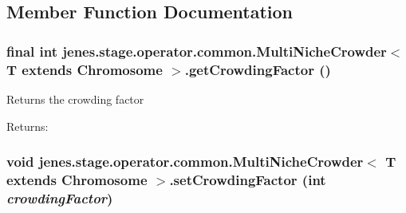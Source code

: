 \subsection{Member Function Documentation}
\hypertarget{classjenes_1_1stage_1_1operator_1_1common_1_1_multi_niche_crowder_3_01_t_01extends_01_chromosome_01_4_74363393b7e200fcff467ff5920e10d6}{
\subsubsection[getCrowdingFactor]{\setlength{\rightskip}{0pt plus 5cm}final int jenes.stage.operator.common.MultiNicheCrowder$<$ T extends Chromosome $>$.getCrowdingFactor ()}}
\label{classjenes_1_1stage_1_1operator_1_1common_1_1_multi_niche_crowder_3_01_t_01extends_01_chromosome_01_4_74363393b7e200fcff467ff5920e10d6}


Returns the crowding factor

\begin{Desc}
\item[Returns:]\end{Desc}
\hypertarget{classjenes_1_1stage_1_1operator_1_1common_1_1_multi_niche_crowder_3_01_t_01extends_01_chromosome_01_4_d00602ac8b97b385a8a72fd612e2ac22}{
\subsubsection[setCrowdingFactor]{\setlength{\rightskip}{0pt plus 5cm}void jenes.stage.operator.common.MultiNicheCrowder$<$ T extends Chromosome $>$.setCrowdingFactor (int {\em crowdingFactor})}}
\label{classjenes_1_1stage_1_1operator_1_1common_1_1_multi_niche_crowder_3_01_t_01extends_01_chromosome_01_4_d00602ac8b97b385a8a72fd612e2ac22}



